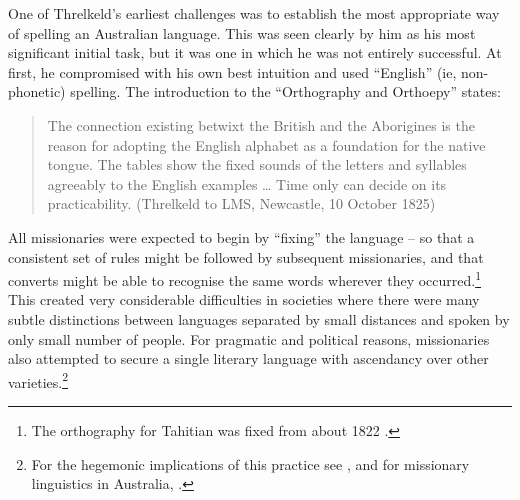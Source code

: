 {One of Threlkeld’s earliest challenges was to establish the most appropriate way of spelling an Australian language. This was seen clearly by him as his most significant initial task, but it was one in which he was not entirely successful. At first, he compromised with his own best intuition and used “English” (ie, non-phonetic) spelling. The introduction to the \citeyear{threlkeld_orthography_1825} “Orthography and Orthoepy” states:

\begin{quote}
     The connection existing betwixt the British and the Aborigines is the reason for adopting the English alphabet as a foundation for the native tongue. The tables show the fixed sounds of the letters and syllables agreeably to the English examples … Time only can decide on its practicability. (Threlkeld to LMS, Newcastle, 10 October 1825) \citep[box 2/ folder 3]{lms_australia_1818-1831}
\end{quote}

All missionaries were expected to begin by “fixing” the language -- so that a consistent set of rules might be followed by subsequent missionaries, and that converts might be able to recognise the same words wherever they occurred.\footnote{The orthography for Tahitian was fixed from about 1822 \citep[73, n. 30]{gunson_australian_1974a}.} This created very considerable difficulties in societies where there were many subtle distinctions between languages separated by small distances and spoken by only small number of people. For pragmatic and political reasons, missionaries also attempted to secure a single literary language with ascendancy over other varieties.\footnote{For the hegemonic implications of this practice see \citet{landau_realm_1995}, and for missionary linguistics in Australia, \citet{carey_lancelot_2004}.}

}
